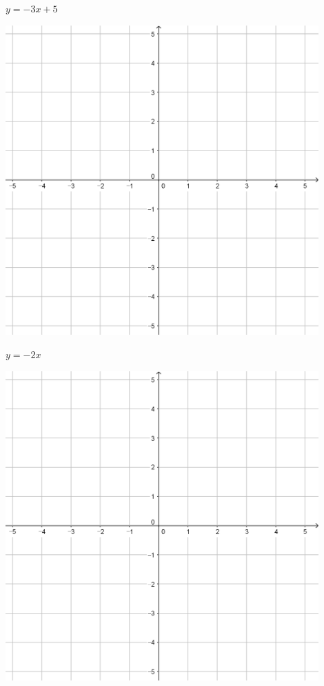 \documentclass{oblivoir}
\begin{document}
\begin{minipage}{0.45\textwidth}\centering
\(y=-3x+5\)
\par\bigskip\includegraphics[width=0.9\textwidth]{55}
\end{minipage}
\begin{minipage}{0.45\textwidth}\centering
\(y=-2x\)
\par\bigskip\includegraphics[width=0.9\textwidth]{55}
\end{minipage}\bigskip\bigskip\par
\end{document}
